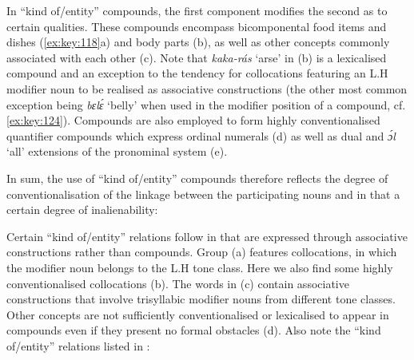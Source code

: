 In “kind of/entity” compounds, the first component modifies the second as to certain qualities. These compounds encompass bicomponental food items and dishes (\ref{ex:key:118}a) and body parts (b), as well as other concepts commonly associated with each other (c). Note that \textit{kaka-rás} ‘arse’ in (b) is a lexicalised compound and an exception to the tendency for collocations featuring an L.H modifier noun to be realised as associative constructions (the other most common exception being \textit{bɛlɛ́} ‘belly’ when used in the modifier position of a compound, cf. \ref{ex:key:124}). Compounds are also employed to form highly conventionalised quantifier compounds which express ordinal numerals{\fff} (d) as well as dual and \textit{ɔ́l} ‘all’ extensions of the pronominal system (e).



In sum, the use of “kind of/entity” compounds therefore reflects the degree of conventionalisation of the linkage between the participating nouns and in that a certain degree of inalienability:


Certain “kind of/entity” relations follow in  that are expressed through associative constructions rather than compounds. Group (a) features collocations, in which the modifier noun belongs to the L.H tone class. Here we also find some highly conventionalised collocations (b). The words in (c) contain associative constructions that involve trisyllabic modifier nouns from different tone classes. Other concepts are not sufficiently conventionalised or lexicalised to appear in compounds even if they present no formal obstacles (d). Also note the “kind of/entity” relations listed in : 

